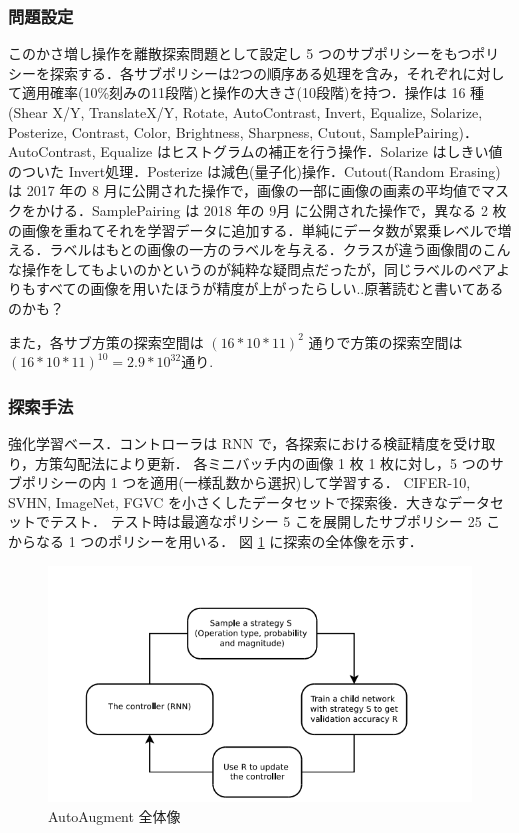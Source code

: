 \documentclass[onecolumn]{ujarticle}   %
\begin{document}
	\subsubsection{問題設定}
	このかさ増し操作を離散探索問題として設定し 5 つのサブポリシーをもつポリシーを探索する．各サブポリシーは2つの順序ある処理を含み，それぞれに対して適用確率(10\%刻みの11段階)と操作の大きさ(10段階)を持つ．操作は 16 種(Shear X/Y, TranslateX/Y, Rotate, AutoContrast, Invert, Equalize, Solarize, Posterize, Contrast, Color, Brightness, Sharpness, Cutout, SamplePairing)．AutoContrast, Equalize はヒストグラムの補正を行う操作．Solarize はしきい値のついた Invert処理．Posterize は減色(量子化)操作．Cutout(Random Erasing) \cite{DBLP:journals/corr/abs-1708-04552, DBLP:journals/corr/abs-1708-04896} は 2017 年の 8 月に公開された操作で，画像の一部に画像の画素の平均値でマスクをかける．SamplePairing \cite{DBLP:journals/corr/abs-1801-02929} は 2018 年の 9月 に公開された操作で，異なる 2 枚の画像を重ねてそれを学習データに追加する．単純にデータ数が累乗レベルで増える．ラベルはもとの画像の一方のラベルを与える．クラスが違う画像間のこんな操作をしてもよいのかというのが純粋な疑問点だったが，同じラベルのペアよりもすべての画像を用いたほうが精度が上がったらしい..原著読むと書いてあるのかも？

	また，各サブ方策の探索空間は $(16*10*11)^2$ 通りで方策の探索空間は $(16*10*11)^{10} = 2.9*10^{32}$通り.

  \subsubsection{探索手法}
	強化学習ベース．コントローラは RNN で，各探索における検証精度を受け取り，方策勾配法により更新．
	各ミニバッチ内の画像 1 枚 1 枚に対し，5 つのサブポリシーの内 1 つを適用(一様乱数から選択)して学習する．
	CIFER-10, SVHN, ImageNet, FGVC を小さくしたデータセットで探索後．大きなデータセットでテスト．
	テスト時は最適なポリシー 5 こを展開したサブポリシー 25 こからなる 1 つのポリシーを用いる．
	図 \ref{fig:AutoAugment} に探索の全体像を示す．
	\begin{figure}
		\begin{center}
		  \includegraphics[width=13cm]{AutoAugment.png}
			\caption{AutoAugment 全体像}
			\label{fig:AutoAugment}
		\end{center}
	\end{figure}
\end{document}
